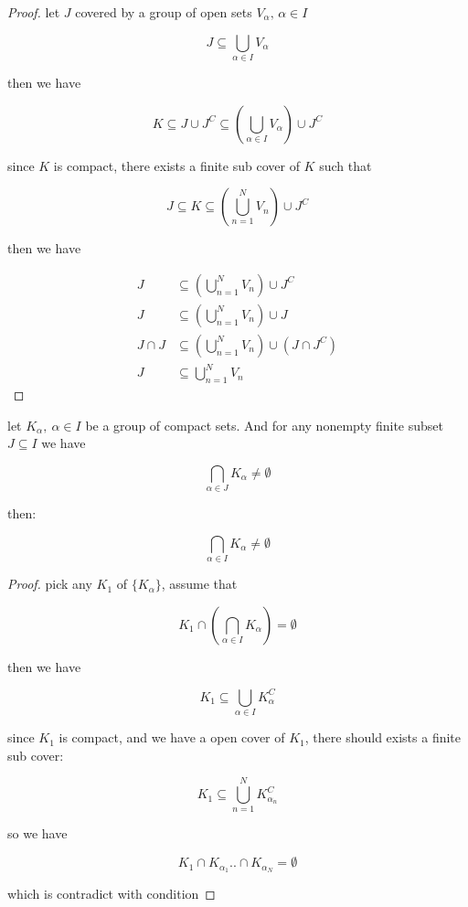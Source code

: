\begin{proof}
    let $J$ covered by a group of open sets $V_{\alpha},\, \alpha \in I$

    \[
        J \subseteq \bigcup_{\alpha \in I} V_{\alpha}
    \]

    then we have

    \[
        K \subseteq J \cup J^C \subseteq \left(\bigcup_{\alpha \in I} V_{\alpha}\right) \cup J^C
    \]

    since $K$ is compact, there exists a finite sub cover of $K$ such that

    \[
        J \subseteq K \subseteq \left(\bigcup_{n=1}^{N} V_{n}\right) \cup J^C
    \]

    then we have

    \begin{align*}
        J & \subseteq \left(\bigcup_{n=1}^{N} V_{n}\right) \cup J^C \\
        J & \subseteq \left(\bigcup_{n=1}^{N} V_{n}\right) \cup J \\
        J \cap J & \subseteq \left(\bigcup_{n=1}^{N} V_{n}\right) \cup (J \cap J^C) \\
        J & \subseteq \bigcup_{n=1}^{N} V_{n}
    \end{align*}

\end{proof}

\begin{thm}
    let $K_{\alpha},\: \alpha \in I$ be a group of compact sets. And for any nonempty finite subset $J \subseteq I$ we have


    \[
        \bigcap_{\alpha \in J} K_{\alpha} \ne \emptyset
    \]

    then:

    \[
        \bigcap_{\alpha \in I} K_{\alpha} \ne \emptyset
    \]
\end{thm}

\begin{proof}



    pick any $K_1$ of  $\{ K_{\alpha}\}$, assume that

    \[
        K_1 \cap \left( \bigcap_{\alpha \in I} K_{\alpha} \right) = \emptyset
    \]

    then we have

    \[
        K_1 \subseteq \bigcup_{\alpha \in I}K_{\alpha}^C
    \]

    since $K_1$ is compact, and we have a open cover of $K_1$, there should exists a finite sub cover:

    \[
        K_1 \subseteq \bigcup_{n=1}^{N}K_{\alpha_n}^C
    \]

    so we have

    \[
        K_1 \cap K_{\alpha_1} .. \cap K_{\alpha_N} = \emptyset
    \]

    which is contradict with condition
\end{proof}

